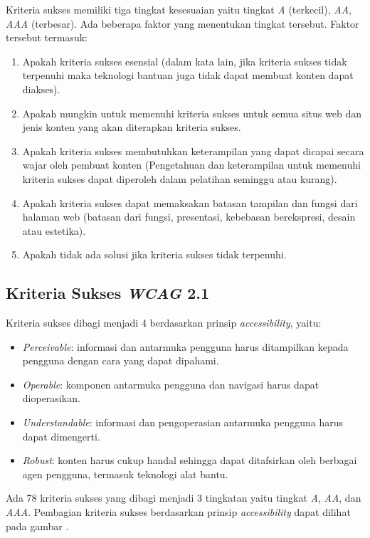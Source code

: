 Kriteria sukses memiliki tiga tingkat kesesuaian yaitu tingkat \textit{A} (terkecil), \textit{AA}, \textit{AAA} (terbesar). Ada beberapa faktor yang menentukan tingkat tersebut. Faktor tersebut termasuk:

\begin{enumerate}
	\item Apakah kriteria sukses esensial (dalam kata lain, jika kriteria sukses tidak terpenuhi maka teknologi bantuan juga tidak dapat membuat konten dapat diakses).
	\item Apakah mungkin untuk memenuhi kriteria sukses untuk semua situs web dan jenis konten yang akan diterapkan kriteria sukses.
	\item Apakah kriteria sukses membutuhkan keterampilan yang dapat dicapai secara wajar oleh pembuat konten (Pengetahuan dan keterampilan untuk memenuhi kriteria sukses dapat diperoleh dalam pelatihan seminggu atau kurang).
	\item Apakah kriteria sukses dapat memaksakan batasan tampilan dan fungsi dari halaman web (batasan dari fungsi, presentasi, kebebasan berekspresi, desain atau estetika).
	\item Apakah tidak ada solusi jika kriteria sukses tidak terpenuhi.
\end{enumerate}

\subsection{Kriteria Sukses \textit{WCAG} 2.1}
\label{subsec:kriteria_sukses_wcag_2_1}

Kriteria sukses dibagi menjadi 4 berdasarkan prinsip \textit{accessibility}, yaitu:
\begin{itemize}
	\item \textit{Perceivable}: informasi dan antarmuka pengguna harus ditampilkan kepada pengguna dengan cara yang dapat dipahami.
	\item \textit{Operable}: komponen antarmuka pengguna dan navigasi harus dapat dioperasikan.
	\item \textit{Understandable}: informasi dan pengoperasian antarmuka pengguna harus dapat dimengerti.
	\item \textit{Robust}: konten harus cukup handal sehingga dapat ditafsirkan oleh berbagai agen pengguna, termasuk teknologi alat bantu.
\end{itemize}

Ada 78 kriteria sukses yang dibagi menjadi 3 tingkatan yaitu tingkat \textit{A}, \textit{AA}, dan \textit{AAA}. Pembagian kriteria sukses berdasarkan prinsip \textit{accessibility} dapat dilihat pada gambar .

